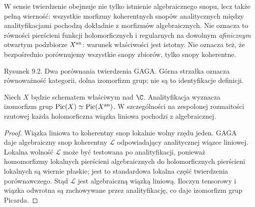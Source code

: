\begin{uwaga}
W sensie  twierdzenie obejmuje nie tylko istnienie algebraicznego
snopu, lecz także pełną wierność: wszystkie morfizmy
koherentnych snopów analitycznych między analityfikacjami
pochodzą dokładnie z morfizmów algebraicznych.
Nie oznacza to równości pierścieni funkcji holomorficznych
i regularnych na dowolnym \emph{afinicznym} otwartym
podzbiorze $X^{\rm an}$: warunek właściwości jest
istotny. Nie oznacza też, że bezpośrednio porównujemy
wszystkie snopy zbiorów, tylko snopy koherentne.
\end{uwaga}

\begin{center}

{\small Rysunek 9.2. Dwa porównania twierdzenia GAGA.
Górna strzałka oznacza równoważność kategorii, dolna
izomorfizm grup; nie są to identyfikacje definicji.}\par
\end{center}

\begin{stwierdzenie}
Niech $X$ będzie schematem właściwym nad $\C$.
Analityfikacja wyznacza izomorfizm grup
$\operatorname{Pic}(X)\simeq\operatorname{Pic}(X^{\rm an})$.
W szczególności na zespolonej rozmaitości rzutowej
każda holomorficzna wiązka liniowa pochodzi z algebraicznej.
\end{stwierdzenie}
\begin{proof}
Wiązka liniowa to koherentny snop lokalnie wolny rzędu jeden.
GAGA daje algebraiczny snop koherentny $\mathcal L$ odpowiadający
analitycznej wiązce liniowej. Lokalna wolność $\mathcal L$
może być testowana po analityfikacji, ponieważ homomorfizmy
lokalnych pierścieni algebraicznych do holomorficznych
pierścieni lokalnych są wiernie płaskie; jest to standardowa
lokalna część twierdzenia porównawczego. Stąd $\mathcal L$
jest algebraiczną wiązką liniową. Iloczyn tensorowy
i wiązka odwrotna są zachowywane przez analityfikację,
co daje izomorfizm grup Picarda.
\end{proof}

